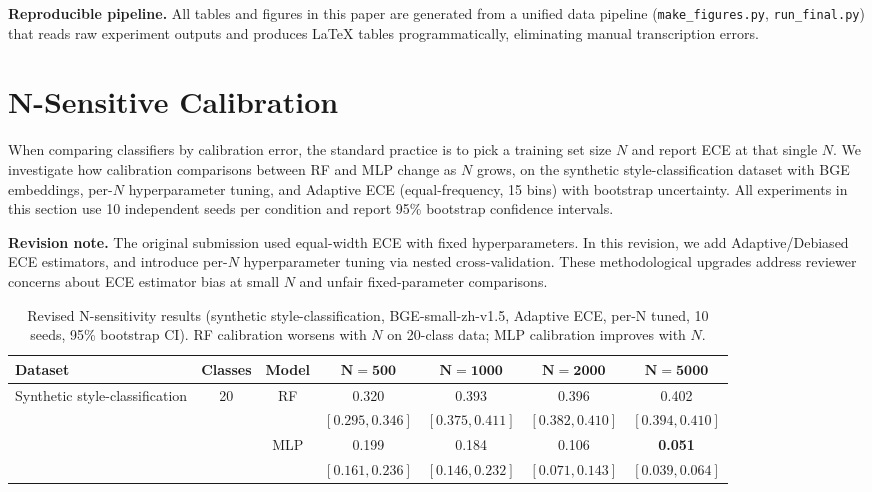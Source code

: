 \documentclass[11pt]{article}
\begin{document}
\textbf{Reproducible pipeline.} All tables and figures in this paper are generated from a unified data pipeline (\texttt{make\_figures.py}, \texttt{run\_final.py}) that reads raw experiment outputs and produces LaTeX tables programmatically, eliminating manual transcription errors.

\section{N-Sensitive Calibration}
\label{sec:n_sensitivity}

When comparing classifiers by calibration error, the standard practice is to pick a training set size $N$ and report ECE at that single $N$. We investigate how calibration comparisons between RF and MLP change as $N$ grows, on the synthetic style-classification dataset with BGE embeddings, per-$N$ hyperparameter tuning, and Adaptive ECE (equal-frequency, 15 bins) with bootstrap uncertainty. All experiments in this section use 10 independent seeds per condition and report 95\% bootstrap confidence intervals.

\textbf{Revision note.} The original submission used equal-width ECE with fixed hyperparameters. In this revision, we add Adaptive/Debiased ECE estimators, and introduce per-$N$ hyperparameter tuning via nested cross-validation. These methodological upgrades address reviewer concerns about ECE estimator bias at small $N$ and unfair fixed-parameter comparisons.

\begin{table}[t]
\centering
\caption{Revised N-sensitivity results (synthetic style-classification, BGE-small-zh-v1.5, Adaptive ECE, per-N tuned, 10 seeds, 95\% bootstrap CI). RF calibration worsens with $N$ on 20-class data; MLP calibration improves with $N$.}
\label{tab:n_sensitivity_new}
\footnotesize
\begin{tabular}{@{}lcccccc@{}}
\toprule
\textbf{Dataset} & \textbf{Classes} & \textbf{Model} & $\mathbf{N{=}500}$ & $\mathbf{N{=}1000}$ & $\mathbf{N{=}2000}$ & $\mathbf{N{=}5000}$ \\
\midrule
Synthetic style-classification & 20 & RF  & 0.320 & 0.393 & 0.396 & 0.402 \\
& & & $[0.295,0.346]$ & $[0.375,0.411]$ & $[0.382,0.410]$ & $[0.394,0.410]$ \\
              &    & MLP & 0.199 & 0.184 & 0.106 & \textbf{0.051} \\
& & & $[0.161,0.236]$ & $[0.146,0.232]$ & $[0.071,0.143]$ & $[0.039,0.064]$ \\
\bottomrule
\end{tabular}
\end{table}
\end{document}
